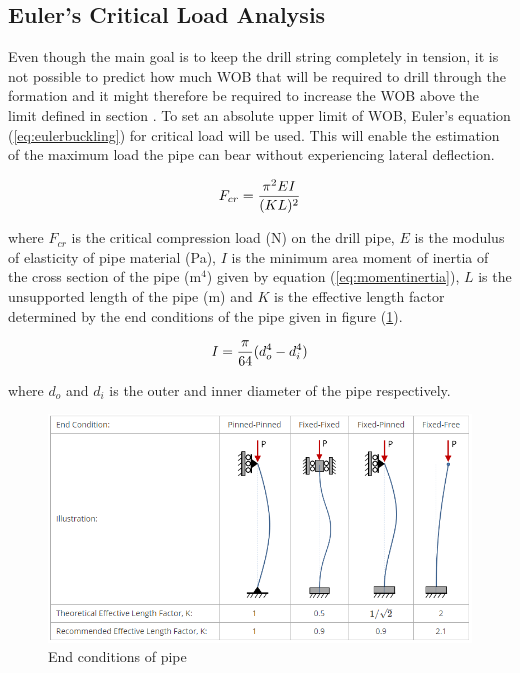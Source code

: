 \subsection{Euler's Critical Load Analysis}

Even though the main goal is to keep the drill string completely in tension, it is not possible to predict how much WOB that will be required to drill through the formation and it might therefore be required to increase the WOB above the limit defined in section . To set an absolute upper limit of WOB, Euler's equation (\ref{eq:eulerbuckling}) for critical load will be used. This will enable the estimation of the maximum load the pipe can bear without experiencing lateral deflection.

\begin{equation}
\centering
   F_{cr}=\frac{\pi^2 E I}{(KL)^2}
\label{eq:eulerbuckling}
\end{equation}

where $F_{cr}$ is the critical compression load (N) on the drill pipe, $E$ is the modulus of elasticity of pipe material (Pa), $I$ is the minimum area moment of inertia of the cross section of the pipe (m$^4$) given by equation (\ref{eq:momentinertia}), $L$ is the unsupported length of the pipe (m) and $K$ is the effective length factor determined by the end conditions of the pipe given in figure (\ref{fig:endcondpipe}).

\begin{equation}
\centering
   I=\frac{\pi}{64} (d_o^4-d_i^4)
\label{eq:momentinertia}
\end{equation}

where $d_o$ and $d_i$ is the outer and inner diameter of the pipe respectively.

\begin{figure} [H]
\centering
\includegraphics[width=1.0\textwidth]{figures/endcondpipe.PNG}
\caption{End conditions of pipe \cite{buckling}}
\label{fig:endcondpipe}
\end{figure}

